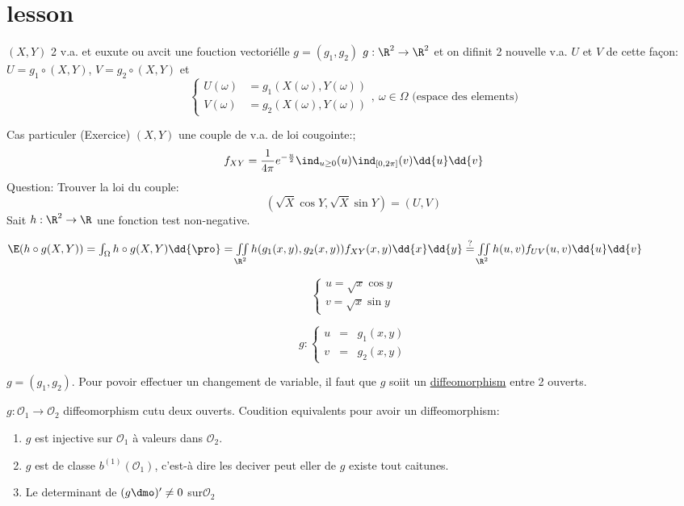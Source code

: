 \section{lesson}

$(X,Y)$ 2 v.a. et euxute ou avcit une fouction vectoriélle $g=(g_1,g_2)$ $g:\R^2\rightarrow\R^2$ et on difinit 2 nouvelle v.a. $U$ et $V$ de cette façon:
$U=g_1\circ (X,Y)$, $V=g_2\circ (X,Y)$ et
$$\left\{\begin{array}{ccc}U(\omega)&=g_1(X(\omega),Y(\omega))\\V(\omega)&=g_2(X(\omega),Y(\omega))\end{array}\right.,\ \omega\in\Omega\text{ (espace des elements)}$$


Cas particuler (Exercice)
$(X,Y)$ une couple de v.a. de loi  cougointe:;
$$f_{XY}=\frac1{4\pi}e^{-\frac u2}\ind_{u\geq 0}(u)\ind_{[0,2\pi]}(v)\dd{u}\dd{v}$$
Question: Trouver la loi du couple:
$$(\sqrt{X}\cos Y, \sqrt X\sin Y)=(U,V)$$
Sait $h:\R^2\rightarrow \R$ une fonction test non-negative.

$\E(h\circ g(X,Y))=\int_\Omega h\circ g(X,Y)\dd{\pro}=\iint\limits_{\R^2}h(g_1(x,y), g_2(x,y))f_{XY}(x,y)\dd{x} \dd{y}\overset{?}{=}\iint\limits_{\R^2}h(u,v)f_{UV}(u,v)\dd{u} \dd{v}$

$$\left\{\begin{array}{ccc}u=\sqrt x \cos y\\ v=\sqrt x \sin y\end{array}\right.$$

$$g: \left\{ \begin{array}{ccc}u&=&g_1(x,y)\\v&=&g_2(x,y)\end{array} \right.$$

$g=(g_1,g_2)$. Pour povoir effectuer un changement de variable, il faut que $g$ soiit un \underline{diffeomorphism} entre 2 ouverts.

$g:\mathcal O_1\rightarrow \mathcal O_2$ diffeomorphism cutu deux ouverts. Coudition equivalents pour avoir un diffeomorphism:
\begin{enumerate}
	\item $g$ est injective sur $\mathcal O_1$ à valeurs dans $\mathcal O_2$.
	\item $g$ est de classe $b^{(1)}(\mathcal O_1)$, c'est-à dire les deciver peut eller de $g$ existe tout caitunes.
	\item Le determinant de $(g\dmo)'\neq 0$ sur$\mathcal O_2$
\end{enumerate}

